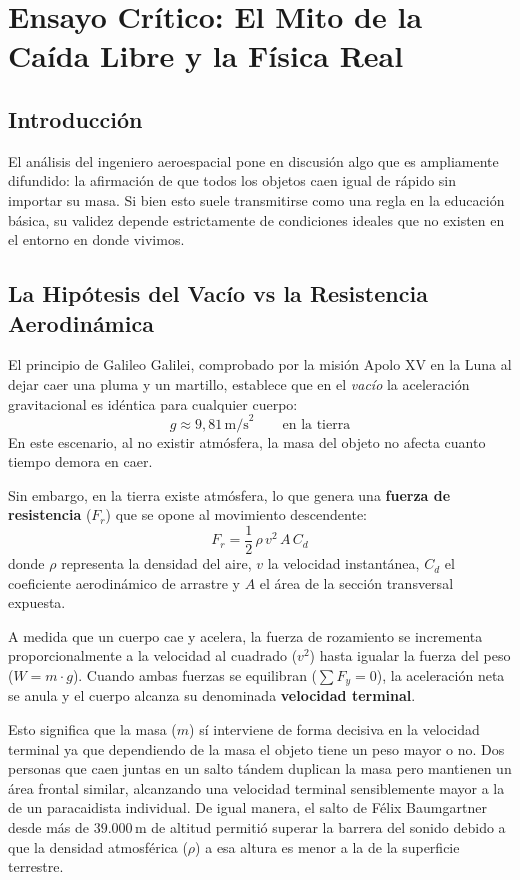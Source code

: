 \documentclass[11pt,a4paper]{article}
\begin{document}
	\vspace{1em}
	\section{Ensayo Crítico: El Mito de la Caída Libre y la Física Real}
	
	\subsection*{Introducción}
	El análisis del ingeniero aeroespacial pone en discusión algo que es ampliamente difundido: la afirmación de que todos los objetos caen igual de rápido sin importar su masa. Si bien esto suele transmitirse como una regla en la educación básica, su validez depende estrictamente de condiciones ideales que no existen en el entorno en donde vivimos.
	
	\subsection*{La Hipótesis del Vacío vs la Resistencia Aerodinámica}
	El principio de Galileo Galilei, comprobado por la misión Apolo XV en la Luna al dejar caer una pluma y un martillo, establece que en el \emph{vacío} la aceleración gravitacional es idéntica para cualquier cuerpo:
	\begin{equation}
		g \approx 9{,}81\,\text{m/s}^2 \qquad\text{en la tierra}
	\end{equation}
	En este escenario, al no existir atmósfera, la masa del objeto no afecta cuanto tiempo demora en caer.
	
	Sin embargo, en la tierra existe atmósfera, lo que genera una \textbf{fuerza de resistencia} ($F_r$) que se opone al movimiento descendente:
	\begin{equation}
		F_r = \frac{1}{2}\,\rho\,v^2\,A\,C_d
	\end{equation}
	donde $\rho$ representa la densidad del aire, $v$ la velocidad instantánea, $C_d$ el coeficiente aerodinámico de arrastre y $A$ el área de la sección transversal expuesta.
	
	A medida que un cuerpo cae y acelera, la fuerza de rozamiento se incrementa proporcionalmente a la velocidad al cuadrado ($v^2$) hasta igualar la fuerza del peso ($W = m \cdot g$). Cuando ambas fuerzas se equilibran ($\sum F_y = 0$), la aceleración neta se anula y el cuerpo alcanza su denominada \textbf{velocidad terminal}. %
	
	Esto significa que la masa ($m$) sí interviene de forma decisiva en la velocidad terminal ya que dependiendo de la masa el objeto tiene un peso mayor o no. Dos personas que caen juntas en un salto tándem duplican la masa pero mantienen un área frontal similar, alcanzando una velocidad terminal sensiblemente mayor a la de un paracaidista individual. De igual manera, el salto de Félix Baumgartner desde más de $39.000\,\text{m}$ de altitud permitió superar la barrera del sonido debido a que la densidad atmosférica ($\rho$) a esa altura es menor a la de la superficie terrestre.
	
\end{document}
